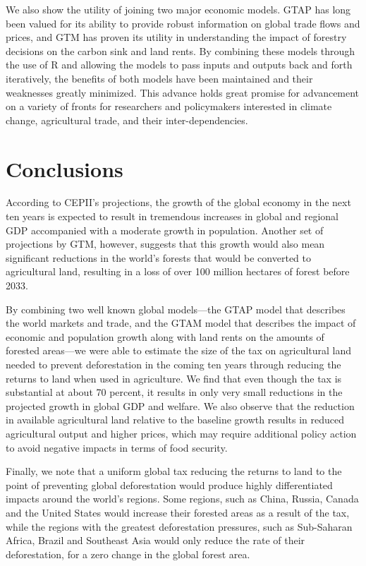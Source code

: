 \documentclass[
]{article}
\begin{document}
We also show the utility of joining two major economic models. GTAP has long been valued for its ability to provide robust information on global trade flows and prices, and GTM has proven its utility in understanding the impact of forestry decisions on the carbon sink and land rents. By combining these models through the use of R and allowing the models to pass inputs and outputs back and forth iteratively, the benefits of both models have been maintained and their weaknesses greatly minimized. This advance holds great promise for advancement on a variety of fronts for researchers and policymakers interested in climate change, agricultural trade, and their inter-dependencies.

\hypertarget{conclusions}{%
\section{Conclusions}\label{conclusions}}

According to CEPII's projections, the growth of the global economy in the next ten years is expected to result in tremendous increases in global and regional GDP accompanied with a moderate growth in population. Another set of projections by GTM, however, suggests that this growth would also mean significant reductions in the world's forests that would be converted to agricultural land, resulting in a loss of over 100 million hectares of forest before 2033.

By combining two well known global models---the GTAP model that describes the world markets and trade, and the GTAM model that describes the impact of economic and population growth along with land rents on the amounts of forested areas---we were able to estimate the size of the tax on agricultural land needed to prevent deforestation in the coming ten years through reducing the returns to land when used in agriculture. We find that even though the tax is substantial at about 70 percent, it results in only very small reductions in the projected growth in global GDP and welfare. We also observe that the reduction in available agricultural land relative to the baseline growth results in reduced agricultural output and higher prices, which may require additional policy action to avoid negative impacts in terms of food security.

Finally, we note that a uniform global tax reducing the returns to land to the point of preventing global deforestation would produce highly differentiated impacts around the world's regions. Some regions, such as China, Russia, Canada and the United States would increase their forested areas as a result of the tax, while the regions with the greatest deforestation pressures, such as Sub-Saharan Africa, Brazil and Southeast Asia would only reduce the rate of their deforestation, for a zero change in the global forest area.
\end{document}
